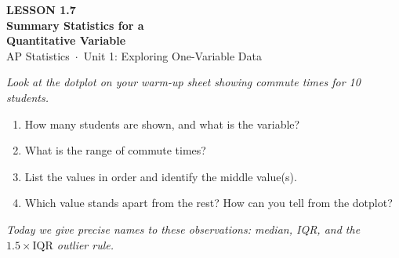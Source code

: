 \documentclass[aspectratio=169, 11pt]{beamer}
\begin{document}
{
\begin{frame}[plain]
  \vspace{2.8cm}
  \hspace{0.55cm}%
  \begin{minipage}{0.9\textwidth}
    {\color{goldacc}\bfseries\small LESSON 1.7}\\[0.5cm]
    {\color{white}\bfseries\LARGE Summary Statistics for a\\[0.25cm]
      Quantitative Variable}\\[1.4cm]
    {\color{skymid}\small AP Statistics~$\cdot$~Unit 1: Exploring One-Variable Data}
  \end{minipage}
\end{frame}
}

{
\begin{frame}[t, plain]
  \vspace{1em}%
  \hspace{0.55cm}%
  \begin{minipage}{0.9\textwidth}
    \small
    \textit{Look at the dotplot on your warm-up sheet showing commute times for 10 students.}

    \vspace{0.5em}
    \begin{enumerate}
      \setlength{\itemsep}{0.6em}\setlength{\topsep}{0em}
      \item How many students are shown, and what is the variable?
      \item What is the range of commute times?
      \item List the values in order and identify the middle value(s).
      \item Which value stands apart from the rest? How can you tell from the dotplot?
    \end{enumerate}
    \vspace{0.4cm}
    {\color{navy}\itshape\small
      Today we give precise names to these observations: median, IQR, and the
      $1.5\times\text{IQR}$ outlier rule.}
  \end{minipage}
\end{frame}
}
\end{document}
